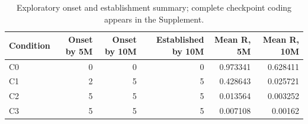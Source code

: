 \begin{table}[!htbp]
\centering
\caption{Exploratory onset and establishment summary; complete checkpoint coding appears in the Supplement.}
\label{tab:table02-v35-exploratory-outcomes-main}
\small
\setlength{\tabcolsep}{4pt}
\begin{tabular}{lrrrrr}
\toprule
Condition & Onset by 5M & Onset by 10M & Established by 10M & Mean R, 5M & Mean R, 10M \\
\midrule
C0 & 0 & 0 & 0 & 0.973341 & 0.628411 \\
C1 & 2 & 5 & 5 & 0.428643 & 0.025721 \\
C2 & 5 & 5 & 5 & 0.013564 & 0.003252 \\
C3 & 5 & 5 & 5 & 0.007108 & 0.00162 \\
\bottomrule
\end{tabular}
\end{table}
